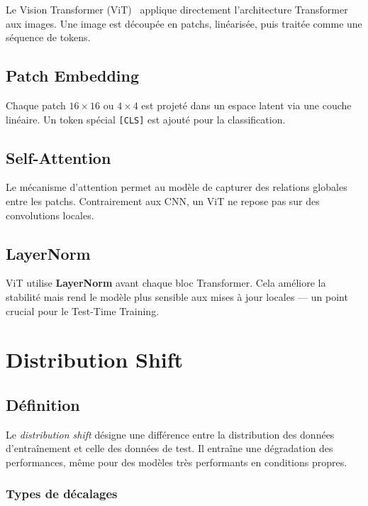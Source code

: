 \documentclass[12pt,a4paper]{report}
\begin{document}
	Le Vision Transformer (ViT)~\cite{Dosovitskiy2021} applique directement l’architecture Transformer aux images.  
	Une image est découpée en patchs, linéarisée, puis traitée comme une séquence de tokens.
	
	\subsection{Patch Embedding}
	
	Chaque patch $16\times16$ ou $4\times4$ est projeté dans un espace latent via une couche linéaire.  
	Un token spécial \texttt{[CLS]} est ajouté pour la classification.
	
	\subsection{Self-Attention}
	
	Le mécanisme d’attention permet au modèle de capturer des relations globales entre les patchs.  
	Contrairement aux CNN, un ViT ne repose pas sur des convolutions locales.
	
	\subsection{LayerNorm}
	
	ViT utilise \textbf{LayerNorm} avant chaque bloc Transformer.  
	Cela améliore la stabilité mais rend le modèle plus sensible aux mises à jour locales — un point crucial pour le Test-Time Training.
	
	\section{Distribution Shift}
	
	\subsection{Définition}
	
	Le \emph{distribution shift} désigne une différence entre la distribution des données d’entraînement et celle des données de test.  
	Il entraîne une dégradation des performances, même pour des modèles très performants en conditions propres.
	
	\subsubsection{Types de décalages}
	
\end{document}
